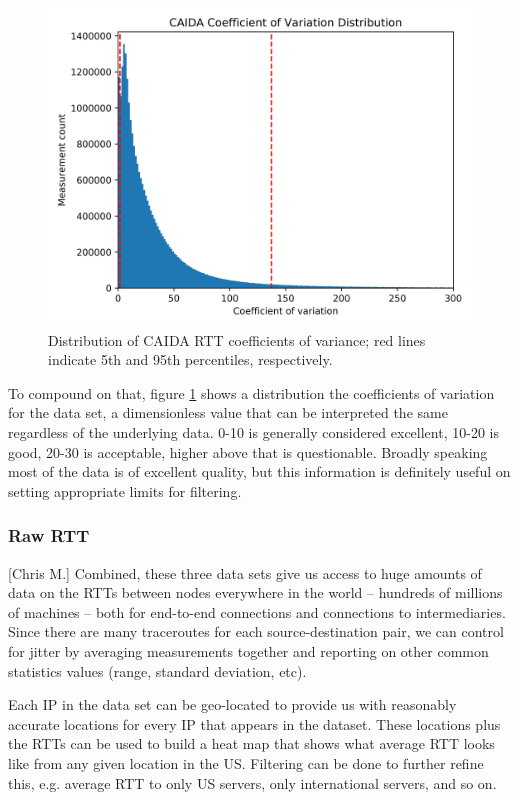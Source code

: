 \documentclass[12pt]{article}
\begin{document}
\begin{figure}[H]
    \centering
    \includegraphics[width=\textwidth]{images/CAIDA_cv_dist.png}
    \caption{Distribution of CAIDA RTT coefficients of variance; red lines indicate 5th and 95th percentiles, respectively.}
    \label{fig:rtt_cv_dst}
\end{figure}

To compound on that, figure \ref{fig:rtt_cv_dst} shows a distribution the coefficients of variation for the data set, a dimensionless value that can be interpreted the same regardless of the underlying data. 0-10 is generally considered excellent, 10-20 is good, 20-30 is acceptable, higher above that is questionable. Broadly speaking most of the data is of excellent quality, but this information is definitely useful on setting appropriate limits for filtering.

\subsubsection{Raw RTT}[Chris M.]
Combined, these three data sets give us access to huge amounts of data on the RTTs between nodes everywhere in the world -- hundreds of millions of machines -- both for end-to-end connections and connections to intermediaries. Since there are many traceroutes for each source-destination pair, we can control for jitter by averaging measurements together and reporting on other common statistics values (range, standard deviation, etc).

Each IP in the data set can be geo-located to provide us with reasonably accurate locations for every IP that appears in the dataset. These locations plus the RTTs can be used to build a heat map that shows what average RTT looks like from any given location in the US. Filtering can be done to further refine this, e.g. average RTT to only US servers, only international servers, and so on.
\end{document}
